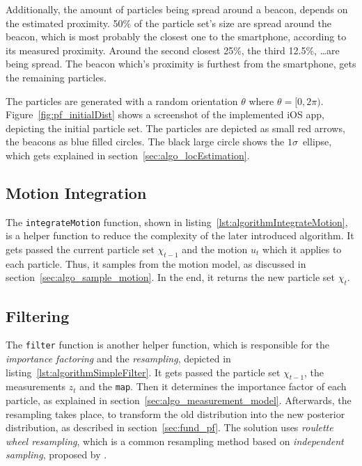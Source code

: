 Additionally, the amount of particles being spread around a beacon, depends on the estimated proximity. 50\% of the particle set's size are spread around the beacon, which is most probably the closest one to the smartphone, according to its measured proximity. Around the second closest 25\%, the third 12.5\%, \ldots are being spread. The beacon which's proximity is furthest from the smartphone, gets the remaining particles.

The particles are generated with a random orientation $\theta$ where $\theta = [0, 2\pi)$. Figure~\ref{fig:pf_initialDist} shows a screenshot of the implemented iOS app, depicting the initial particle set. The particles are depicted as small red arrows, the beacons as blue filled circles. The black large circle shows the $1\sigma$~ellipse, which gets explained in section~\ref{sec:algo_locEstimation}.


\subsection{Motion Integration}
The \texttt{integrateMotion} function, shown in listing~\ref{lst:algorithmIntegrateMotion}, is a helper function to reduce the complexity of the later introduced algorithm. It gets passed the current particle set $\chi_{t-1}$ and the motion $u_t$ which it applies to each particle. Thus, it samples from the motion model, as discussed in section~\ref{sec:algo_sample_motion}. In the end, it returns the new particle set $\chi_t$.




\subsection{Filtering}
The \texttt{filter} function is another helper function, which is responsible for the \emph{importance factoring} and the \emph{resampling}, depicted in listing~\ref{lst:algorithmSimpleFilter}. It gets passed the particle set $\chi_{t-1}$, the measurements $z_t$ and the \texttt{map}. Then it determines the importance factor of each particle, as explained in section~\ref{sec:algo_measurement_model}. Afterwards, the resampling takes place, to transform the old distribution into the new posterior distribution, as described in section~\ref{sec:fund_pf}. The solution uses \emph{roulette wheel resampling}, which is a common resampling method based on \emph{independent sampling}, proposed by \citet[p. 108--111]{thrun:prob_robo}.

